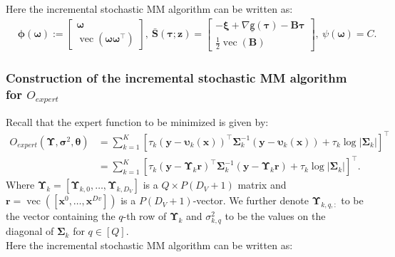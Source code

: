 \documentclass{article}
\DeclareMathOperator*{\vect}{vec} %
\def\phib        {{\sbmm{\phi}}\XS}        \def\Phib       {{\sbmm{\Phi}}\XS}
\def\XS{\xspace}
\def\sbmm#1{\ensuremath{\boldsymbol{#1}}}
\def\bars{\bar{\vS}}
\def\sfg{\mathsf{g}}
\def\vxi{{\bm{\xi}}}
\def\vtau{{\bm{\tau}}}
\def\vsigma{{\bm{\sigma}}}
\def\vomega{{\bm{\omega}}}
\def\vupsilon{{\bm{\upsilon}}}
\def\vtheta{{\bm{\theta}}}
\def\vr{{\bm{r}}}
\def\vS{{\bm{S}}}
\def\vx{{\bm{x}}}
\def\vy{{\bm{y}}}
\def\vz{{\bm{z}}}
\def\mB{{\bm{B}}}
\def\mSigma{{\bm{\Sigma}}}
\def\mUpsilon{{\bm{\Upsilon}}}
\begin{document}
Here the incremental stochastic MM algorithm can be written as:
\begin{align*}
    &\phib(\vomega):=
    \begin{bmatrix}
      \vomega\\
      \vect(\vomega\vomega^{\top})
    \end{bmatrix}, ~\bars(\vtau;\vz)=
    \begin{bmatrix}
      -\vxi+\nabla \underline{\sfg}(\vtau)-\mB\vtau \\
      \frac{1}{2}\vect(\mB)
    \end{bmatrix},~\psi(\vomega)=C.
\end{align*}
\subsubsection{Construction of the incremental stochastic MM algorithm for \texorpdfstring{$O_{expert}$}{}}\label{section_construction_MM_Oexpert}
Recall that the expert function to be minimized is given by:
\begin{align*}  
  O_{expert}(\mUpsilon,\vsigma^2,\vtheta) &=\displaystyle\sum_{k=1}^{K}\left[ \tau_{k} {(\vy - \vupsilon_k(\vx))^\top \mSigma_k^{-1} (\vy - \vupsilon_k(\vx))}+ \tau_k \log \lvert \mSigma_k \rvert\right]^{\top}\\
  &=\displaystyle\sum_{k=1}^{K}\left[ \tau_{k} {(\vy - \mUpsilon_k\vr)^\top \mSigma_k^{-1} (\vy - \mUpsilon_k\vr)}+ \tau_k \log \lvert \mSigma_k \rvert\right]^{\top}.
\end{align*}
Where $\mUpsilon_k=\left[\mUpsilon_{k,0},\dots,\mUpsilon_{k,D_V}\right]$ is a $Q\times P(D_V+1)$ matrix and $\vr=\vect\left(\left[\vx^{0},\dots,\vx^{Dv}\right]\right)$ is a $P(D_V+1)$-vector. We further denote $\mUpsilon_{k,q,:}$ to be the vector containing the $q$-th row of $\mUpsilon_k$ and $\sigma_{k,q}^2$ to be the values on the diagonal of $\mSigma_k$ for $q \in [Q]$.\\
Here the incremental stochastic MM algorithm can be written as:
\end{document}

